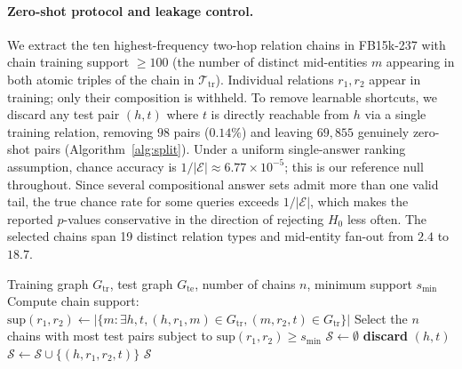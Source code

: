 \documentclass[11pt]{article}
\theoremstyle{definition}
\begin{document}
\paragraph{Zero-shot protocol and leakage control.}
We extract the ten highest-frequency two-hop relation chains in FB15k-237 with
chain training support $\geq 100$ (the number of distinct mid-entities $m$
appearing in both atomic triples of the chain in $\mathcal{T}_{\mathrm{tr}}$).
Individual relations $r_1, r_2$ appear in training; only their composition is
withheld. To remove learnable shortcuts, we discard any test pair $(h, t)$
where $t$ is directly reachable from $h$ via a single training relation,
removing $98$ pairs ($0.14\%$) and leaving $69{,}855$ genuinely zero-shot
pairs (Algorithm~\ref{alg:split}). Under a uniform single-answer ranking
assumption, chance accuracy is $1/|\mathcal{E}| \approx 6.77 \times 10^{-5}$;
this is our reference null throughout. Since several compositional answer sets
admit more than one valid tail, the true chance rate for some queries exceeds
$1/|\mathcal{E}|$, which makes the reported $p$-values conservative in the
direction of rejecting $H_0$ less often. The selected chains span 19 distinct
relation types and mid-entity fan-out from $2.4$ to $18.7$.

\begin{algorithm}[t]
\caption{Leakage-controlled zero-shot evaluation set construction}
\label{alg:split}
\begin{algorithmic}[1]
\Require Training graph $G_{\mathrm{tr}}$, test graph $G_{\mathrm{te}}$,
         number of chains $n$, minimum support $s_{\min}$
  \State Compute chain support: 
         $\text{sup}(r_1,r_2) \gets |\{m : \exists h,t, (h,r_1,m) \in G_{\mathrm{tr}}, 
         (m,r_2,t) \in G_{\mathrm{tr}}\}|$
\EndFor
\State Select the $n$ chains with most test pairs subject to 
       $\text{sup}(r_1,r_2) \geq s_{\min}$
\State $\mathcal{S} \gets \emptyset$
    \quad {}
    \State \textbf{discard} $(h, t)$
  \Else
    \State $\mathcal{S} \gets \mathcal{S} \cup \{(h, r_1, r_2, t)\}$
  \EndIf
\EndFor
\Ensure $\mathcal{S}$ 
\end{algorithmic}
\end{algorithm}

\end{document}
